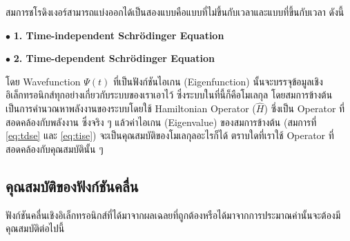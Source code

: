 สมการชโรดิงเงอร์สามารถแบ่งออกได้เป็นสองแบบคือแบบที่ไม่ขึ้นกับเวลาและแบบที่ขึ้นกับเวลา ดังนี้

\noindent $\bullet$ \textbf{1. Time-independent Schr\"{o}dinger Equation}


\noindent $\bullet$ \textbf{2. Time-dependent Schr\"{o}dinger Equation}


โดย Wavefunction $\Psi(t)$ ที่เป็นฟังก์ชันไอเกน (Eigenfunction) นั้นจะบรรจุข้อมูลเชิงอิเล็กทรอนิกส์ทุกอย่างเกี่ยวกับระบบของเราเอาไว้%
\autocite{szabo1996,cramer2004,jensen2017} ซึ่งระบบในที่นี้ก็คือโมเลกุล โดยสมการข้างต้นเป็นการคำนวณหาพลังงานของระบบโดยใช้ 
Hamiltonian Operator ($\hat{H}$) ซึ่งเป็น Operator ที่สอดคล้องกับพลังงาน ซึ่งจริง ๆ แล้วค่าไอเกน (Eigenvalue) ของสมการข้างต้น 
(สมการที่ \ref{eq:tdse} และ \ref{eq:tise}) จะเป็นคุณสมบัติของโมเลกุลอะไรก็ได้ ตราบใดที่เราใช้ Operator ที่สอดคล้องกับคุณสมบัตินั้น ๆ 

\subsection{คุณสมบัติของฟังก์ชันคลื่น}
\label{ssec:wavefunc_prop}

ฟังก์ชันคลื่นเชิงอิเล็กทรอนิกส์ที่ได้มาจากผลเฉลยที่ถูกต้องหรือได้มาจากการประมาณค่านั้นจะต้องมีคุณสมบัติต่อไปนี้ 

